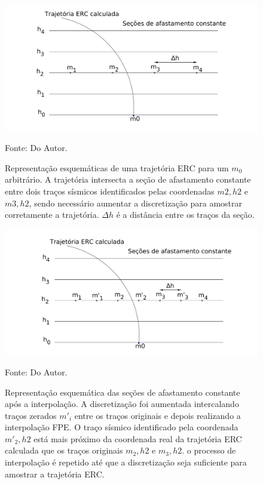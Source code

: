 \begin{figure}
\caption{Representação esquemáticas de uma trajetória ERC para um $m_0$ arbitrário. A trajetória intersecta a seção de
afastamento constante entre dois traços sísmicos identificados pelas coordenadas $m2, h2$ e $m3, h2$, sendo necessário
aumentar a discretização para amostrar corretamente a trajetória. $\Delta h$ é a distância entre os traços da seção.}
\begin{center}
\includegraphics[scale=0.15]{images/interpolacao0.png}
\vspace{-0.3cm}
\end{center}
\begin{center}
 Fonte: Do Autor.
\end{center}
\label{fig:3.1}
\end{figure}


\begin{figure}
\caption{Representação esquemática das seções de afastamento constante após a interpolação. A discretização foi aumentada
intercalando traços zerados $m'_i$ entre os traços originais e depois realizando a interpolação FPE. O traço sísmico 
identificado pela coordenada $m'_2, h2$ está mais próximo da coordenada real da trajetória ERC calculada que os traços 
originais $m_2, h2$ e $m_3, h2$. o processo de interpolação é repetido até que a discretização seja suficiente para amostrar a 
trajetória ERC.}
\begin{center}
\includegraphics[scale=0.15]{images/interpolacao.png}
\vspace{-0.3cm}
\end{center}
\begin{center}
 Fonte: Do Autor.
\end{center}
\label{fig:3.2}
\end{figure}


